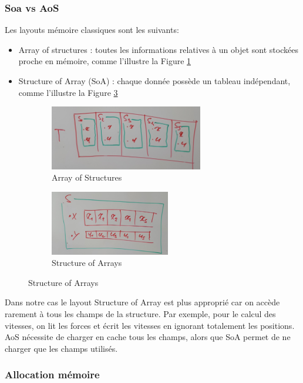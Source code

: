 \subsubsection{Soa vs AoS}

Les layouts mémoire classiques sont les suivants:
\begin{itemize}
	\item Array of structures : toutes les informations relatives à un objet sont stockées proche en mémoire, comme l'illustre la Figure \ref{fig:array_of_structures}
	\item Structure of Array (SoA) : chaque donnée possède un tableau indépendant, comme l'illustre la Figure \ref{fig:structure_of_arrays}
\end{itemize}

\begin{figure}[H]
	\centering
	\begin{subfigure}{0.48\textwidth}
		\centering
		\includegraphics[height=80pt]{img/array_of_structures}
		\caption{Array of Structures}
		\label{fig:array_of_structures}
	\end{subfigure}
	\begin{subfigure}{0.48\textwidth}
		\centering
		\includegraphics[height=80pt]{img/structure_of_arrays}
		\caption{Structure of Arrays}
		\label{fig:structure_of_arrays}
	\end{subfigure}	
\end{figure}

Dans notre cas le layout Structure of Array est plus approprié car on accède rarement à tous les champs de la structure. Par exemple, pour le calcul des vitesses, on lit les forces et écrit les vitesses en ignorant totalement les positions. AoS nécessite de charger en cache tous les champs, alors que SoA permet de ne charger que les champs utilisés.

\subsubsection{Allocation mémoire}

